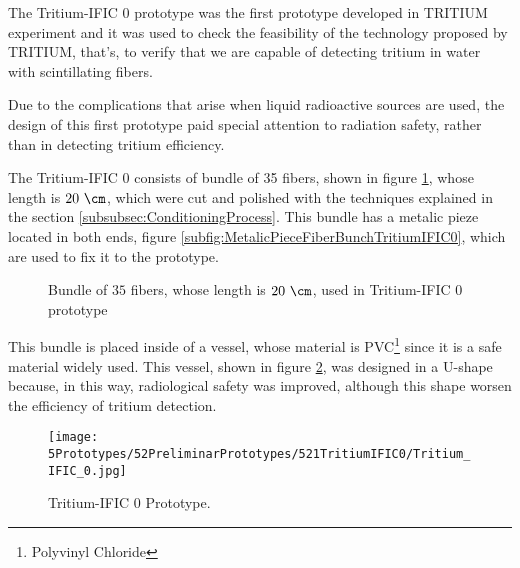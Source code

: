 The Tritium-IFIC 0 prototype was the first prototype developed in TRITIUM experiment and it was used to check the feasibility of the technology proposed by TRITIUM, that's, to verify that we are capable of detecting tritium in water with scintillating fibers.

Due to the complications that arise when liquid radioactive sources are used, the design of this first prototype paid special attention to radiation safety, rather than in detecting tritium efficiency.

The Tritium-IFIC 0 consists of bundle of 35 fibers, shown in figure \ref{fig:FiberBundleOfTritiumIFIC0}, whose length is $20~\cm$, which were cut and polished with the techniques explained in the section \ref{subsubsec:ConditioningProcess}. This bundle has a metalic pieze located in both ends, figure \ref{subfig:MetalicPieceFiberBunchTritiumIFIC0}, which are used to fix it to the prototype.

\begin{figure}[h]
 \centering
    \newline
 \caption{Bundle of $35$ fibers, whose length is $20~\cm$, used in Tritium-IFIC 0 prototype}
 \label{fig:FiberBundleOfTritiumIFIC0}
\end{figure}

This bundle is placed inside of a vessel, whose material is PVC\footnote{Polyvinyl Chloride}  since it is a safe material widely used. This vessel, shown in figure \ref{fig:TritiumIFIC0}, was designed in a U-shape because, in this way, radiological safety was improved, although this shape worsen the efficiency of tritium detection.

\begin{figure}[h]
\centering
\texttt{[image: 5Prototypes/52PreliminarPrototypes/521TritiumIFIC0/Tritium\_IFIC\_0.jpg]}
\caption{Tritium-IFIC 0 Prototype.\label{fig:TritiumIFIC0}}
\end{figure}

